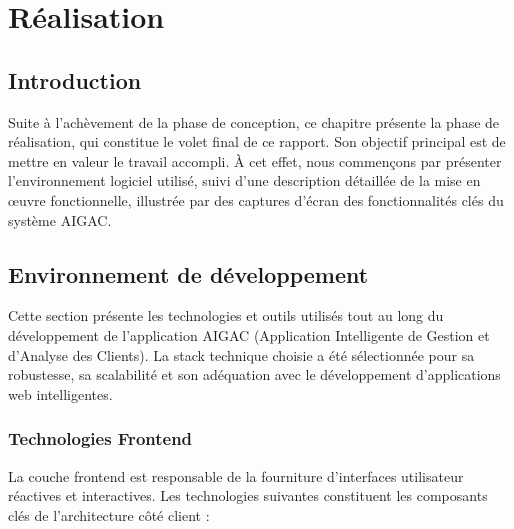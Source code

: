 \chapter{Réalisation} \label{sec:realisation}

\section{Introduction}
Suite à l'achèvement de la phase de conception, ce chapitre présente la phase de réalisation, qui constitue le volet final de ce rapport. Son objectif principal est de mettre en valeur le travail accompli. À cet effet, nous commençons par présenter l'environnement logiciel utilisé, suivi d'une description détaillée de la mise en œuvre fonctionnelle, illustrée par des captures d'écran des fonctionnalités clés du système AIGAC.

\section{Environnement de développement}
Cette section présente les technologies et outils utilisés tout au long du développement de l'application AIGAC (Application Intelligente de Gestion et d'Analyse des Clients). La stack technique choisie a été sélectionnée pour sa robustesse, sa scalabilité et son adéquation avec le développement d'applications web intelligentes.

\subsection{Technologies Frontend}
La couche frontend est responsable de la fourniture d'interfaces utilisateur réactives et interactives. Les technologies suivantes constituent les composants clés de l'architecture côté client :

